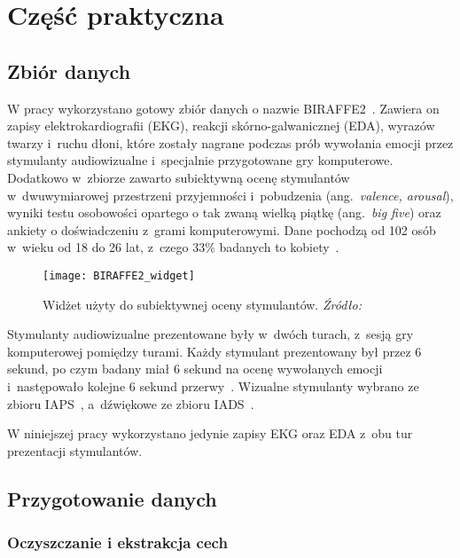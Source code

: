 \chapter{Część praktyczna}\label{ch:czesc-praktyczna}

\section{Zbiór danych}\label{sec:zbior-danych}

W pracy wykorzystano gotowy zbiór danych o nazwie BIRAFFE2~\cite{Kutt2022}.
Zawiera on zapisy elektrokardiografii (EKG), reakcji skórno-galwanicznej (EDA), wyrazów twarzy i~ruchu dłoni, które zostały nagrane podczas prób wywołania emocji przez stymulanty audiowizualne i~specjalnie przygotowane gry komputerowe.
Dodatkowo w~zbiorze zawarto subiektywną ocenę stymulantów w~dwuwymiarowej przestrzeni przyjemności i~pobudzenia (ang.~\textit{valence, arousal}), wyniki testu osobowości opartego o tak zwaną wielką piątkę (ang.~\textit{big five}) oraz ankiety o doświadczeniu z~grami komputerowymi.
Dane pochodzą od 102 osób w~wieku od 18 do 26 lat, z~czego 33\% badanych to kobiety~\cite{Kutt2022}.

\begin{figure}[h]
    \centering
    \texttt{[image: BIRAFFE2\_widget]}
    \caption{Widżet użyty do subiektywnej oceny stymulantów. \textit{Źródło:~\cite{Kutt2022}}}
    \label{fig:BIRAFFE2-widget}
\end{figure}

Stymulanty audiowizualne prezentowane były w~dwóch turach, z~sesją gry komputerowej pomiędzy turami.
Każdy stymulant prezentowany był przez 6 sekund, po czym badany miał 6 sekund na ocenę wywołanych emocji i~następowało kolejne 6 sekund przerwy~\cite{Kutt2022}.
Wizualne stymulanty wybrano ze zbioru IAPS~\cite{IAPS}, a~dźwiękowe ze zbioru IADS~\cite{IADS}.

W niniejszej pracy wykorzystano jedynie zapisy EKG oraz EDA z~obu tur prezentacji stymulantów.

\section{Przygotowanie danych}\label{sec:przygotowanie-danych}

\subsection{Oczyszczanie i ekstrakcja cech}\label{subsec:oczyszczanie-i-ekstrakcja-cech}


